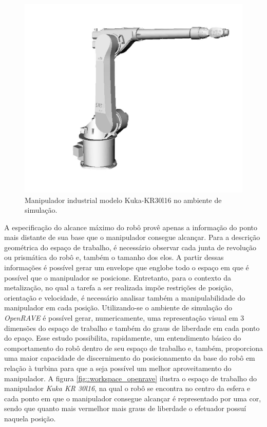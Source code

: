 \begin{figure}[h!]
\centering
	\includegraphics[width=0.8\columnwidth]{figs/openrave/kukakr30l16_openrave}
	\caption{Manipulador industrial modelo Kuka-KR30l16 no ambiente de simulação.}
	\label{fig::kukakr30l16_openrave}
\end{figure}

A especificação do alcance máximo do robô provê apenas a informação do ponto
mais distante de sua base que o manipulador consegue alcançar. Para a descrição
geométrica do espaço de trabalho, é necessário observar cada junta de revolução
ou prismática do robô e, também o tamanho dos elos. A partir dessas informações
é possível gerar um envelope que englobe todo o espaço em que é possível que o
manipulador se posicione. Entretanto, para o contexto da metalização, no qual a
tarefa a ser realizada impõe restrições de posição, orientação e velocidade, é
necessário analisar também a manipulabilidade do manipulador em cada posição.
Utilizando-se o ambiente de simulação do \textit{OpenRAVE} é possível gerar,
numericamente, uma representação visual em 3 dimensões do espaço de trabalho e
também do graus de liberdade em cada ponto do epaço. Esse estudo possibilita,
rapidamente, um entendimento básico do comportamento do robô dentro de seu
espaço de trabalho e, também, proporciona uma maior capacidade de discernimento
do posicionamento da base do robô em relação à turbina para que a seja possível
um melhor aproveitamento do manipulador. A figura \ref{fig::workspace_openrave} ilustra o espaço de
trabalho do manipulador \textit{Kuka KR 30l16}, na qual o robô se
encontra no centro da esfera e cada ponto em que o manipulador consegue
alcançar é representado por uma cor, sendo que quanto mais vermelhor mais graus
de liberdade o efetuador possuí naquela posição.

